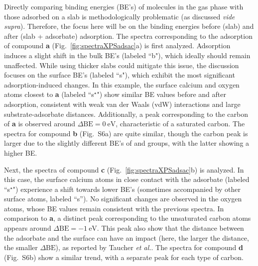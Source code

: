 \documentclass[journal=jpccck,manuscript=article]{achemso}
\def\dbe{\ensuremath{\Delta\text{BE}}}
\begin{document}
Directly comparing binding energies (BE's) of molecules in the gas phase with those adsorbed on a slab is methodologically problematic (as discussed \textit{vide supra}). Therefore, the focus here will be on the binding energies before (slab) and after (slab + adsorbate) adsorption.
The spectra corresponding to the adsorption of compound \textbf{a} (Fig.~\ref{fig:spectraXPSadsac}a) is first analyzed. Adsorption induces a slight shift in the bulk BE's (labeled ``b"), which ideally should remain unaffected. While using thicker slabs could mitigate this issue, the discussion  focuses on the surface BE's (labeled ``s"), which exhibit the most significant adsorption-induced changes. In this example, the surface calcium and oxygen atoms closest to \textbf{a} (labeled ``s$^\star$") show similar BE values before and after adsorption, consistent with weak van der Waals (vdW) interactions and large substrate-adsorbate distances. Additionally, a peak corresponding to the carbon of \textbf{a} is observed around $\dbe = \SI{0}{\electronvolt}$, characteristic of a saturated carbon. The spectra for compound \textbf{b} (Fig.~S6a) are quite similar, though the carbon peak is larger due to the slightly different BE's of  and  groups, with the latter showing a higher BE.


Next, the spectra of compound \textbf{c} (Fig.~\ref{fig:spectraXPSadsac}b) is analyzed. In this case, the surface calcium atoms in close contact with the adsorbate (labeled ``s$^\star$") experience a shift towards lower BE's (sometimes accompanied by other surface atoms,  labeled ``s''). No significant changes are observed in the oxygen atoms, whose BE values remain consistent with the previous spectra. In comparison to \textbf{a}, a distinct peak corresponding to the unsaturated carbon atoms appears around $\dbe = \SI{-1}{\electronvolt}$. This peak also show that the distance between the adsorbate and the surface can have an impact (here, the larger the distance, the smaller \dbe{}), as reported by Taucher \emph{et al.}\cite{taucherFinalStateSimulationsCoreLevel2020}. The spectra for compound \textbf{d} (Fig.~S6b) show a similar trend, with a separate peak for each type of carbon.


\clearpage
\end{document}
